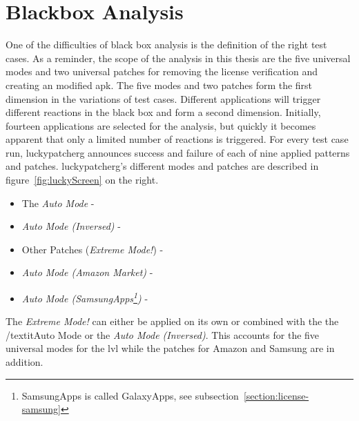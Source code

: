 \section{Blackbox Analysis} \label{section:luckypatcher-blackbox}
One of the difficulties of black box analysis is the definition of the right test cases.
As a reminder, the scope of the analysis in this thesis are the five universal modes and two universal patches for removing the license verification and creating an modified \gls{apk}.
The five modes and two patches form the first dimension in the variations of test cases.
Different applications will trigger different reactions in the black box and form a second dimension.
\newline
Initially, fourteen applications are selected for the analysis, but quickly it becomes apparent that only a limited number of reactions is triggered.
For every test case run, \gls{luckypatcherg} announces success and failure of each of nine applied patterns and patches.
\newline
\gls{luckypatcherg}’s different modes and patches are described in figure~\ref{fig:luckyScreen} on the right.
\begin{itemize}
\item The \textit{Auto Mode} - \grqq
\item \textit{Auto Mode (Inversed)} - \grqq
\item Other Patches (\textit{Extreme Mode!}) - \grqq
\item \textit{Auto Mode (Amazon Market)} - \grqq
\item \textit{Auto Mode (SamsungApps\footnote[1]{SamsungApps is called GalaxyApps, see subsection~\ref{section:license-samsung}})} - \grqq
\end{itemize}
The \textit{Extreme Mode!} can either be applied on its own or combined with the the /textit{Auto Mode} or the \textit{Auto Mode (Inversed)}.
This accounts for the five universal modes for the \gls{lvl} while the patches for Amazon and Samsung are in addition.
\newline
